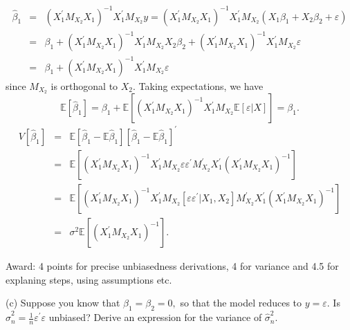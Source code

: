 \documentclass{article}
\begin{document}
\begin{eqnarray*}
\hat{\beta}_{1} &=&\left( X_{1}^{\prime }M_{X_{2}}X_{1}\right)
^{-1}X_{1}^{\prime }M_{X_{2}}y=\left( X_{1}^{\prime }M_{X_{2}}X_{1}\right)
^{-1}X_{1}^{\prime }M_{X_{2}}\left( X_{1}\beta _{1}+X_{2}\beta
_{2}+\varepsilon \right) \\
&=&\beta _{1}+\left( X_{1}^{\prime }M_{X_{2}}X_{1}\right) ^{-1}X_{1}^{\prime
}M_{X_{2}}X_{2}\beta _{2}+\left( X_{1}^{\prime }M_{X_{2}}X_{1}\right)
^{-1}X_{1}^{\prime }M_{X_{2}}\varepsilon \\
&=&\beta _{1}+\left( X_{1}^{\prime }M_{X_{2}}X_{1}\right) ^{-1}X_{1}^{\prime
}M_{X_{2}}\varepsilon
\end{eqnarray*}%
since $M_{X_{2}}$ is orthogonal to $X_{2}.$ Taking expectations, we have 
\begin{equation*}
\mathbb{E}\left[ \hat{\beta}_{1}\right] =\beta _{1}+\mathbb{E}\left[ \left(
X_{1}^{\prime }M_{X_{2}}X_{1}\right) ^{-1}X_{1}^{\prime }M_{X_{2}}\mathbb{E}%
\left[ \varepsilon |X\right] \right] =\beta _{1}.
\end{equation*}
\begin{eqnarray*}
V\left[ \hat{\beta}_{1}\right] &=&\mathbb{E}\left[ \hat{\beta}_{1}-\mathbb{E}%
\hat{\beta}_{1}\right] \left[ \hat{\beta}_{1}-\mathbb{E}\hat{\beta}_{1}%
\right] ^{\prime } \\
&=&\mathbb{E}\left[ \left( X_{1}^{\prime }M_{X_{2}}X_{1}\right)
^{-1}X_{1}^{\prime }M_{X_{2}}\varepsilon \varepsilon ^{\prime
}M_{X_{2}}^{\prime }X_{1}^{\prime }\left( X_{1}^{\prime
}M_{X_{2}}X_{1}\right) ^{-1}\right] \\
&=&\mathbb{E}\left[ \left( X_{1}^{\prime }M_{X_{2}}X_{1}\right)
^{-1}X_{1}^{\prime }M_{X_{2}}\left[ \varepsilon \varepsilon ^{\prime
}|X_{1},X_{2}\right] M_{X_{2}}^{\prime }X_{1}^{\prime }\left( X_{1}^{\prime
}M_{X_{2}}X_{1}\right) ^{-1}\right] \\
&=&\sigma ^{2}\mathbb{E}\left[ \left( X_{1}^{\prime }M_{X_{2}}X_{1}\right)
^{-1}\right] .
\end{eqnarray*}

Award: 4 points for precise unbiasedness derivations, 4 for variance and 4.5
for explaning steps, using assumptions etc.

(c) Suppose you know that $\beta _{1}=\beta _{2}=0,$ so that the model
reduces to $y=\varepsilon .$ Is $\hat{\sigma}_{n}^{2}=\frac{1}{n}\varepsilon
^{\prime }\varepsilon $ unbiased? Derive an expression for the variance of $%
\hat{\sigma}_{n}^{2}.$
\end{document}
